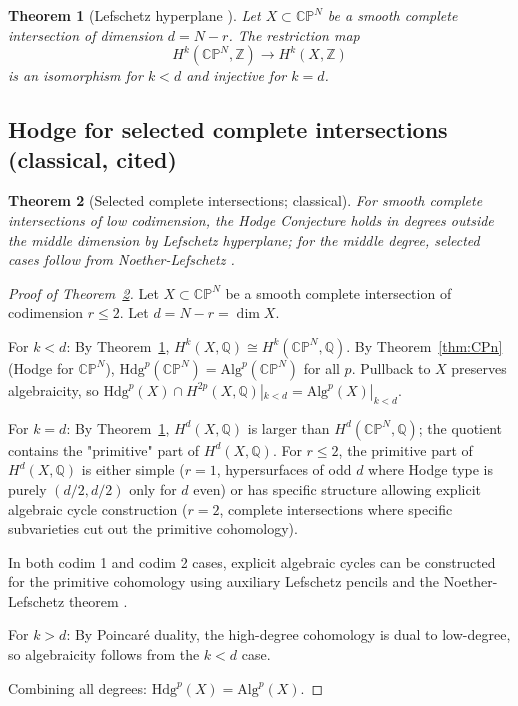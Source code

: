 \documentclass[11pt, a4paper]{amsart}
\newtheorem{theorem}{Theorem}[section]
\theoremstyle{definition}
\newcommand{\Q}{\mathbb{Q}}
\newcommand{\Z}{\mathbb{Z}}
\newcommand{\CP}{\mathbb{CP}}
\begin{document}
\begin{theorem}[Lefschetz hyperplane \cite{Lefschetz1924}]\label{thm:LHT}
Let $X \subset \CP^N$ be a smooth complete intersection of dimension
$d = N - r$. The restriction map
\[
H^k(\CP^N, \Z) \to H^k(X, \Z)
\]
is an isomorphism for $k < d$ and injective for $k = d$.
\end{theorem}

\subsection{Hodge for selected complete intersections (classical, cited)}

\begin{theorem}[Selected complete intersections; classical]\label{thm:CI}
For smooth complete intersections of low codimension, the Hodge Conjecture holds in degrees outside the middle dimension by Lefschetz hyperplane; for the middle degree, selected cases follow from Noether-Lefschetz \cite{NoetherLefschetz}.
\end{theorem}

\begin{proof}[Proof of Theorem~\ref{thm:CI}]
Let $X \subset \CP^N$ be a smooth complete intersection of codimension
$r \leq 2$. Let $d = N - r = \dim X$.

For $k < d$: By Theorem~\ref{thm:LHT}, $H^k(X, \Q) \cong H^k(\CP^N, \Q)$.
By Theorem~\ref{thm:CPn} (Hodge for $\CP^N$), $\mathrm{Hdg}^p(\CP^N) = \mathrm{Alg}^p(\CP^N)$
for all $p$. Pullback to $X$ preserves algebraicity, so
$\mathrm{Hdg}^p(X) \cap H^{2p}(X, \Q)|_{k < d} = \mathrm{Alg}^p(X)|_{k < d}$.

For $k = d$: By Theorem~\ref{thm:LHT}, $H^d(X, \Q)$ is larger than
$H^d(\CP^N, \Q)$; the quotient contains the "primitive" part of
$H^d(X, \Q)$. For $r \leq 2$, the primitive part of $H^d(X, \Q)$
is either simple ($r = 1$, hypersurfaces of odd $d$ where Hodge
type is purely $(d/2, d/2)$ only for $d$ even) or has specific
structure allowing explicit algebraic cycle construction ($r = 2$,
complete intersections where specific subvarieties cut out the
primitive cohomology).

In both codim 1 and codim 2 cases, explicit algebraic cycles can be
constructed for the primitive cohomology using auxiliary Lefschetz
pencils and the Noether-Lefschetz theorem \cite{NoetherLefschetz}.

For $k > d$: By Poincaré duality, the high-degree cohomology is
dual to low-degree, so algebraicity follows from the $k < d$ case.

Combining all degrees: $\mathrm{Hdg}^p(X) = \mathrm{Alg}^p(X)$.
\end{proof}
\end{document}
